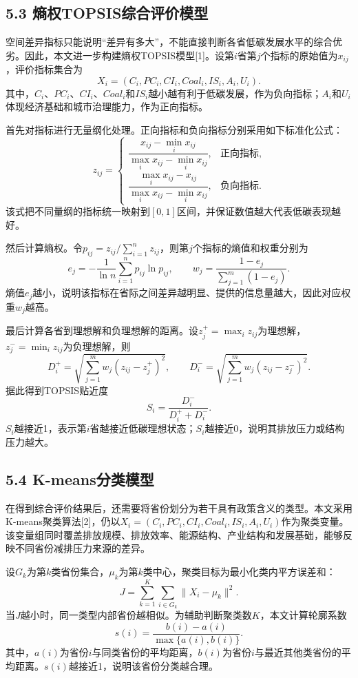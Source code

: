\documentclass[UTF8,zihao=-4,fontset=windows]{ctexart}
\begin{document}
\subsection*{5.3 熵权TOPSIS综合评价模型}

空间差异指标只能说明“差异有多大”，不能直接判断各省低碳发展水平的综合优劣。因此，本文进一步构建熵权TOPSIS模型[1]。设第$i$省第$j$个指标的原始值为$x_{ij}$，评价指标集合为
\[
X_i=(C_i,PC_i,CI_i,Coal_i,IS_i,A_i,U_i).
\]
其中，$C_i$、$PC_i$、$CI_i$、$Coal_i$和$IS_i$越小越有利于低碳发展，作为负向指标；$A_i$和$U_i$体现经济基础和城市治理能力，作为正向指标。

首先对指标进行无量纲化处理。正向指标和负向指标分别采用如下标准化公式：
\[
z_{ij}=
\begin{cases}
\dfrac{x_{ij}-\min_i x_{ij}}{\max_i x_{ij}-\min_i x_{ij}}, & \text{正向指标},\\[8pt]
\dfrac{\max_i x_{ij}-x_{ij}}{\max_i x_{ij}-\min_i x_{ij}}, & \text{负向指标}.
\end{cases}
\]
该式把不同量纲的指标统一映射到$[0,1]$区间，并保证数值越大代表低碳表现越好。

然后计算熵权。令$p_{ij}=z_{ij}/\sum_{i=1}^{n}z_{ij}$，则第$j$个指标的熵值和权重分别为
\[
e_j=-\frac{1}{\ln n}\sum_{i=1}^{n}p_{ij}\ln p_{ij},\qquad
w_j=\frac{1-e_j}{\sum_{j=1}^{m}(1-e_j)}.
\]
熵值$e_j$越小，说明该指标在省际之间差异越明显、提供的信息量越大，因此对应权重$w_j$越高。

最后计算各省到理想解和负理想解的距离。设$z_j^+=\max_i z_{ij}$为理想解，$z_j^-=\min_i z_{ij}$为负理想解，则
\[
D_i^+=\sqrt{\sum_{j=1}^{m}w_j(z_{ij}-z_j^+)^2},\qquad
D_i^-=\sqrt{\sum_{j=1}^{m}w_j(z_{ij}-z_j^-)^2}.
\]
据此得到TOPSIS贴近度
\[
S_i=\frac{D_i^-}{D_i^++D_i^-}.
\]
$S_i$越接近1，表示第$i$省越接近低碳理想状态；$S_i$越接近0，说明其排放压力或结构压力越大。

\subsection*{5.4 K-means分类模型}

在得到综合评价结果后，还需要将省份划分为若干具有政策含义的类型。本文采用K-means聚类算法[2]，仍以$X_i=(C_i,PC_i,CI_i,Coal_i,IS_i,A_i,U_i)$作为聚类变量。该变量组同时覆盖排放规模、排放效率、能源结构、产业结构和发展基础，能够反映不同省份减排压力来源的差异。

设$G_k$为第$k$类省份集合，$\mu_k$为第$k$类中心，聚类目标为最小化类内平方误差和：
\[
J=\sum_{k=1}^{K}\sum_{i\in G_k}\|X_i-\mu_k\|^2.
\]
当$J$越小时，同一类型内部省份越相似。为辅助判断聚类数$K$，本文计算轮廓系数
\[
s(i)=\frac{b(i)-a(i)}{\max\{a(i),b(i)\}}.
\]
其中，$a(i)$为省份$i$与同类省份的平均距离，$b(i)$为省份$i$与最近其他类省份的平均距离。$s(i)$越接近1，说明该省份分类越合理。
\end{document}
